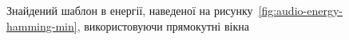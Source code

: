 \begin{figure}[h]

            \caption{Знайдений шаблон в енергії, наведеної на рисунку~\ref{fig:audio-energy-hamming-min},
                використовуючи прямокутні вікна}
            \label{fig:matched-energy-hamming-min-rect}
        \end{figure}

